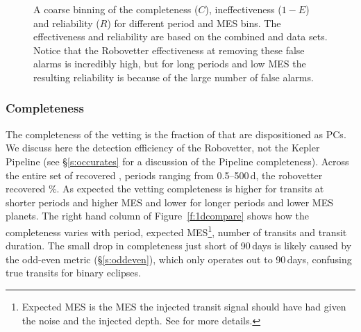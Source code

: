 \begin{figure}[h!]
\begin{center}
\caption{ A coarse binning of the completeness ($C$), ineffectiveness ($1-E$) and reliability ($R$) for different period and MES bins. The effectiveness and reliability are based on the combined \invtce{} and \scrtce{} data sets. Notice that the Robovetter effectiveness at removing these false alarms is incredibly high, but for long periods and low MES the resulting reliability is because of the large number of false alarms. }
\label{f:scoregrid}
\end{center}
\end{figure}



\subsubsection{Completeness}
The completeness of the vetting is the fraction of  that are dispositioned as PCs. We discuss here the detection efficiency of the Robovetter, not the Kepler Pipeline (see \S\ref{s:occurates} for a discussion of the Pipeline completeness). Across the entire set of recovered , periods ranging from 0.5--500\,d, the robovetter recovered \completeness{}\%. As expected the vetting completeness is higher for transits at shorter periods and higher MES and lower for longer periods and lower MES planets. The right hand column of Figure~\ref{f:1dcompare} shows how the completeness varies with period, expected MES\footnote{Expected MES is the MES the injected transit signal should have had given the noise and the injected depth. See \citet{Christiansen2017} for more details.}, number of transits and transit duration. The small drop in completeness just short of 90\,days is likely caused by the odd-even metric (\S\ref{s:oddeven}), which only operates out to 90\,days, confusing true transits for binary eclipses.  

